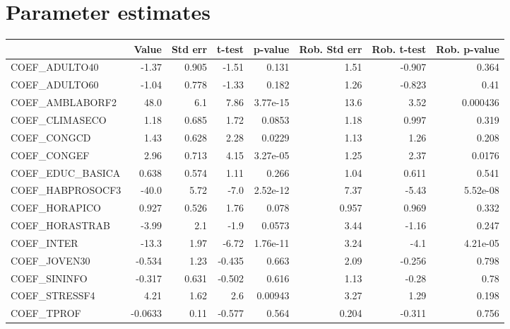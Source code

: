 \section{Parameter estimates}
\begin{tabular}{lrrrrrrr}
\toprule
{} &   Value &  Std err &  t-test &  p-value &  Rob. Std err &  Rob. t-test &  Rob. p-value \\
\midrule
COEF\_ADULTO40       &   -1.37 &    0.905 &   -1.51 &    0.131 &          1.51 &       -0.907 &         0.364 \\
COEF\_ADULTO60       &   -1.04 &    0.778 &   -1.33 &    0.182 &          1.26 &       -0.823 &          0.41 \\
COEF\_AMBLABORF2     &    48.0 &      6.1 &    7.86 & 3.77e-15 &          13.6 &         3.52 &      0.000436 \\
COEF\_CLIMASECO      &    1.18 &    0.685 &    1.72 &   0.0853 &          1.18 &        0.997 &         0.319 \\
COEF\_CONGCD         &    1.43 &    0.628 &    2.28 &   0.0229 &          1.13 &         1.26 &         0.208 \\
COEF\_CONGEF         &    2.96 &    0.713 &    4.15 & 3.27e-05 &          1.25 &         2.37 &        0.0176 \\
COEF\_EDUC\_BASICA    &   0.638 &    0.574 &    1.11 &    0.266 &          1.04 &        0.611 &         0.541 \\
COEF\_HABPROSOCF3    &   -40.0 &     5.72 &    -7.0 & 2.52e-12 &          7.37 &        -5.43 &      5.52e-08 \\
COEF\_HORAPICO       &   0.927 &    0.526 &    1.76 &    0.078 &         0.957 &        0.969 &         0.332 \\
COEF\_HORASTRAB      &   -3.99 &      2.1 &    -1.9 &   0.0573 &          3.44 &        -1.16 &         0.247 \\
COEF\_INTER          &   -13.3 &     1.97 &   -6.72 & 1.76e-11 &          3.24 &         -4.1 &      4.21e-05 \\
COEF\_JOVEN30        &  -0.534 &     1.23 &  -0.435 &    0.663 &          2.09 &       -0.256 &         0.798 \\
COEF\_SININFO        &  -0.317 &    0.631 &  -0.502 &    0.616 &          1.13 &        -0.28 &          0.78 \\
COEF\_STRESSF4       &    4.21 &     1.62 &     2.6 &  0.00943 &          3.27 &         1.29 &         0.198 \\
COEF\_TPROF          & -0.0633 &     0.11 &  -0.577 &    0.564 &         0.204 &       -0.311 &         0.756 \\

\end{tabular}
